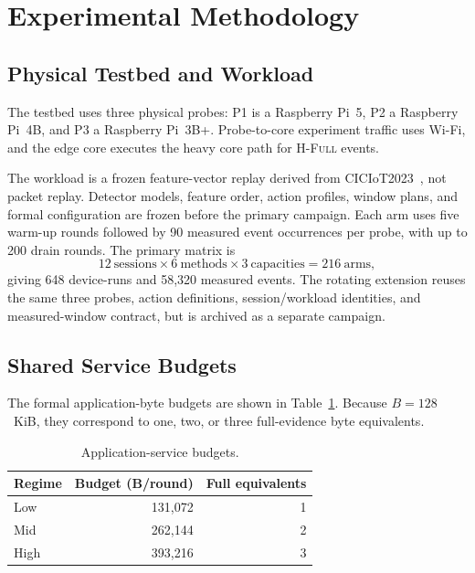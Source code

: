 \documentclass[10pt,journal]{IEEEtran}
\newcommand{\Hfull}{\textsc{H-Full}}
\begin{document}
\section{Experimental Methodology}
\label{sec:method}

\subsection{Physical Testbed and Workload}
The testbed uses three physical probes: P1 is a Raspberry Pi~5, P2 a
Raspberry Pi~4B, and P3 a Raspberry Pi~3B+. Probe-to-core experiment traffic
uses Wi-Fi, and the edge core executes the heavy core path for \Hfull{}
events.

The workload is a frozen feature-vector replay derived from
CICIoT2023~\cite{neto2023ciciot}, not packet replay. Detector models, feature
order, action profiles, window plans, and formal configuration are frozen
before the primary campaign. Each arm uses five warm-up rounds followed by 90
measured event occurrences per probe, with up to 200 drain rounds. The primary
matrix is
\[
12~\text{sessions}\times6~\text{methods}\times3~\text{capacities}
=216~\text{arms},
\]
giving 648 device-runs and 58,320 measured events. The rotating extension
reuses the same three probes, action definitions, session/workload identities,
and measured-window contract, but is archived as a separate campaign.

\subsection{Shared Service Budgets}
The formal application-byte budgets are shown in Table~\ref{tab:capacity}.
Because $B=128$~KiB, they correspond to one, two, or three full-evidence byte
equivalents.
\begin{table}[t]
\centering
\caption{Application-service budgets.}
\label{tab:capacity}
\small
\begin{tabular}{@{}lrr@{}}
\toprule
Regime & Budget (B/round) & Full equivalents \\
\midrule
Low  & 131,072 & 1 \\
Mid  & 262,144 & 2 \\
High & 393,216 & 3 \\
\bottomrule
\end{tabular}
\end{table}
\end{document}
